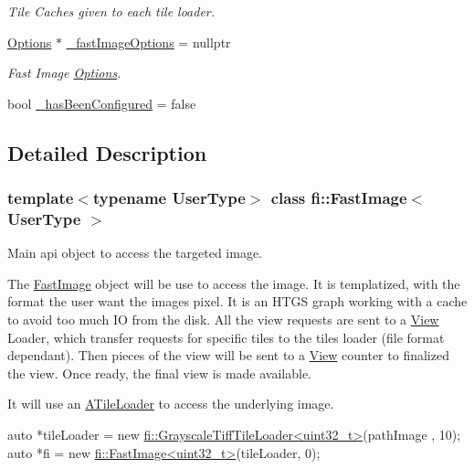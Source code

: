 \begin{DoxyCompactItemize}
\begin{DoxyCompactList}\small\item\em Tile Caches given to each tile loader. \end{DoxyCompactList}\item 
\hyperlink{classfi_1_1FastImage_1_1Options}{Options} $\ast$ \hyperlink{classfi_1_1FastImage_a3ee97b9a34ba54a51254d308506403fb}{\+\_\+fast\+Image\+Options} = nullptr
\begin{DoxyCompactList}\small\item\em Fast Image \hyperlink{classfi_1_1FastImage_1_1Options}{Options}. \end{DoxyCompactList}\item 
bool \hyperlink{classfi_1_1FastImage_a8229ae7c13d06365af07f6cad94662ba}{\+\_\+has\+Been\+Configured} = false
\end{DoxyCompactItemize}


\subsection{Detailed Description}
\subsubsection*{template$<$typename User\+Type$>$\newline
class fi\+::\+Fast\+Image$<$ User\+Type $>$}

Main api object to access the targeted image. 

The \hyperlink{classfi_1_1FastImage}{Fast\+Image} object will be use to access the image. It is templatized, with the format the user want the image\textquotesingle{}s pixel. It is an H\+T\+GS graph working with a cache to avoid too much IO from the disk. All the view requests are sent to a \hyperlink{classfi_1_1View}{View} Loader, which transfer requests for specific tiles to the tiles loader (file format dependant). Then pieces of the view will be sent to a \hyperlink{classfi_1_1View}{View} counter to finalized the view. Once ready, the final view is made available.

It will use an \hyperlink{classfi_1_1ATileLoader}{A\+Tile\+Loader} to access the underlying image.


\begin{DoxyCode}
\textcolor{keyword}{auto} *tileLoader = \textcolor{keyword}{new} \hyperlink{classfi_1_1GrayscaleTiffTileLoader}{fi::GrayscaleTiffTileLoader<uint32\_t>}(pathImage
      , 10);
\textcolor{keyword}{auto} *fi = \textcolor{keyword}{new} \hyperlink{classfi_1_1FastImage}{fi::FastImage<uint32\_t>}(tileLoader, 0);
\end{DoxyCode}


